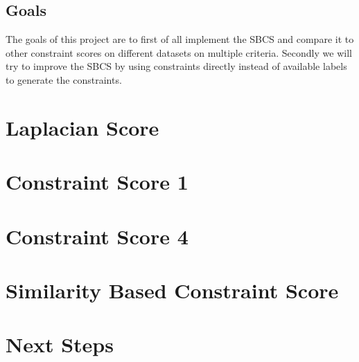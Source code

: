 \documentclass[a4paper,12pt]{article}
\begin{document}
\subsection*{Goals}
The goals of this project are to first of all implement the SBCS and compare it to other constraint scores on different datasets on
multiple criteria. Secondly we will try to improve the SBCS by using constraints directly instead of available labels to generate
the constraints.

\section{Laplacian Score}

\section{Constraint Score 1}

\section{Constraint Score 4}
\section{Similarity Based Constraint Score}
\section{Next Steps}
\printbibliography
\end{document}
